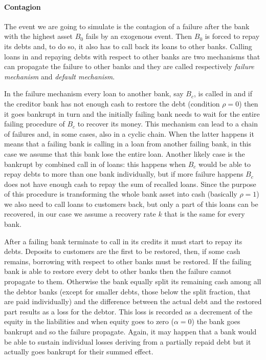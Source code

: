 \documentclass[a4paper, 11pt]{article}
\begin{document}
\paragraph{Contagion} %
The event we are going to simulate is the contagion of a failure after the bank with the highest asset $B_0$ fails by an exogenous event. Then $B_0$ is forced to repay its debts and, to do so, it also has to call back its loans to other banks. Calling loans in and repaying debts with respect to other banks are two mechanisms that can propagate the failure to other banks and they are called respectively \emph{failure mechanism} and \emph{default mechanism}.

In the failure mechanism every loan to another bank, say $B_c$, is called in and if the creditor bank has not enough cash to restore the debt (condition $\rho = 0$) then it goes bankrupt in turn and the initially failing bank needs to wait for the entire failing procedure of $B_c$ to recover its money. This mechanism can lead to a chain of failures and, in some cases, also in a cyclic chain. When the latter happens it means that a failing bank is calling in a loan from another failing bank, in this case we assume that this bank lose the entire loan. Another likely case is the bankrupt by combined call in of loans: this happens when $B_c$ would be able to repay debts to more than one bank individually, but if more failure happens $B_c$ does not have enough cash to repay the sum of recalled loans. Since the purpose of this procedure is transforming the whole bank asset into cash (basically $\rho = 1$) we also need to call loans to customers back, but only a part of this loans can be recovered, in our case we assume a recovery rate $k$ that is the same for every bank.

After a failing bank terminate to call in its credits it must start to repay its debts. Deposits to customers are the first to be restored, then, if some cash remains, borrowing with respect to other banks must be restored. If the failing bank is able to restore every debt to other banks then the failure cannot propagate to them. Otherwise the bank equally split its remaining cash among all the debtor banks (except for smaller debts, those below the split fraction, that are paid individually) and the difference between the actual debt and the restored part results as a loss for the debtor. This loss is recorded as a decrement of the equity in the liabilities and when equity goes to zero ($\alpha = 0$) the bank goes bankrupt and so the failure propagate. Again, it may happen that a bank would be able to sustain individual losses deriving from a partially repaid debt but it actually goes bankrupt for their summed effect.
\end{document}
